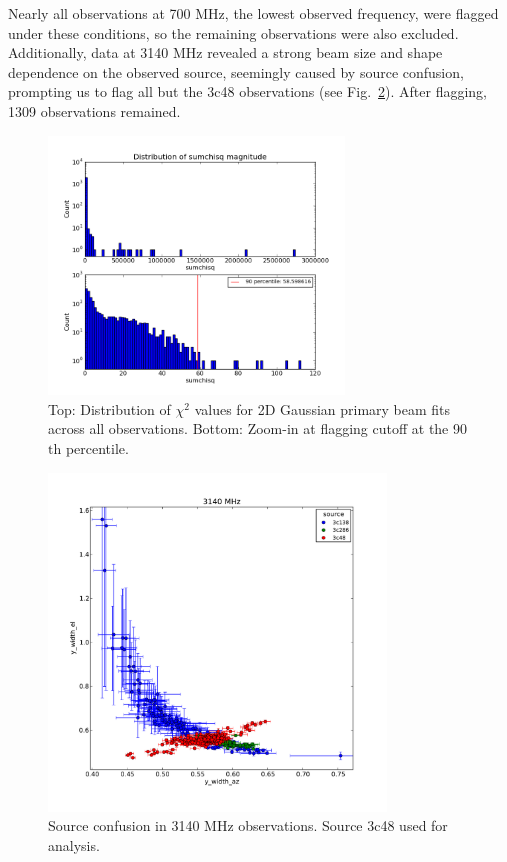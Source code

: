 \documentclass[preprint]{aastex}
\begin{document}
Nearly all observations at 700 MHz, the lowest observed frequency,
were flagged under these conditions, so the remaining observations
were also excluded.  Additionally, data at 3140 MHz revealed a strong
beam size and shape dependence on the observed source, seemingly
caused by source confusion, prompting us to flag all but the 3c48
observations (see Fig.~\ref{fig.source_confusion}).  After flagging,
1309 observations remained.

\begin{figure}[htb]
\begin{center}
\includegraphics[width=0.7\textwidth]{images/dist_sumchisq}
\caption{Top: Distribution of $\chi^2$ values for 2D Gaussian primary
  beam fits across all observations.  Bottom: Zoom-in at
  flagging cutoff at the 90$\textrm{th}$
  percentile. \label{fig.dist_sumchisq}}
\end{center}
\end{figure}

\begin{figure}[htb]
\begin{center}
\includegraphics[width=0.8\textwidth]{images/source_confusion}
\caption{Source confusion in 3140 MHz observations.  Source 3c48 used
  for analysis. \label{fig.source_confusion}}
\end{center}
\end{figure}
\end{document}
